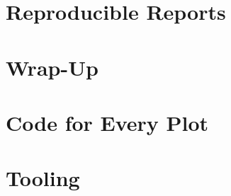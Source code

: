 \documentclass[
   aspectratio=169,
   10pt,
   uniqueslidenumber,
   nosectionframes,
   professionalfonts
]{beamer}
\begin{document}
\section{Reproducible Reports}


\AtBeginSection{}
\renewcommand\CurrentPart{0}
\section*{Wrap-Up}


\EndTiming
\appendix
\renewcommand\RunningToc{}


\section*{Code for Every Plot}
\xlstNumFs{\fontsize{4.5}{5}\selectfont}


\section*{Tooling}

\end{document}
